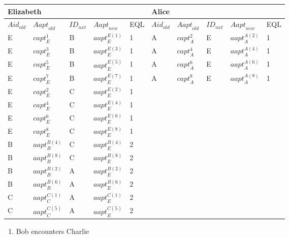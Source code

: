 \begin{tabular}{|p{0.4in}|p{0.5in}|p{0.3in}|p{0.5in}|p{0.3in}|p{0.4in}|p{0.4in}|p{0.3in}|p{0.5in}|p{0.3in}|} \hline 
\multicolumn{5}{|p{1in}|}{Elizabeth} & \multicolumn{5}{|p{1.8in}|}{Alice} \\ \hline 
${Aid}_{old}$ & ${Aapt}_{old}$ & ${ID}_{nxt}$ & ${Aapt}_{new}$ & EQL & ${Aid}_{old}$ & ${Aapt}_{old}$ & ${ID}_{nxt}$ & ${Aapt}_{new}$ & EQL \\ \hline 
E & ${capt}^1_E$ & B & ${aapt}^{E\left(1\right)}_E$ & 1 & A & ${capt}^2_A$ & E & ${aapt}^{A\left(2\right)}_A$ & 1 \\ \hline 
E & ${capt}^3_E$ & B & ${aapt}^{E\left(3\right)}_E$ & 1 & A & ${capt}^4_A$ & E & ${aapt}^{A\left(4\right)}_A$ & 1 \\ \hline 
E & ${capt}^5_E$ & B & ${aapt}^{E\left(5\right)}_E$ & 1 & A & ${capt}^6_A$ & E & ${aapt}^{A\left(6\right)}_A$ & 1 \\ \hline 
E & ${capt}^7_E$ & B & ${aapt}^{E\left(7\right)}_E$ & 1 & A & ${capt}^8_A$ & E & ${aapt}^{A\left(8\right)}_A$ & 1 \\ \hline 
E & ${capt}^2_E$ & C & ${aapt}^{E\left(2\right)}_E$ & 1 &  &  &  &  &  \\ \hline 
E & ${capt}^4_E$ & C & ${aapt}^{E\left(4\right)}_E$ & 1 &  &  &  &  &  \\ \hline 
E & ${capt}^6_E$ & C & ${aapt}^{E\left(6\right)}_E$ & 1 &  &  &  &  &  \\ \hline 
E & ${capt}^8_E$ & C & ${aapt}^{E\left(8\right)}_E$ & 1 &  &  &  &  &  \\ \hline 
B & ${aapt}^{B\left(4\right)}_B$ & C & ${aapt}^{B\left(4\right)}_E$ & 2 &  &  &  &  &  \\ \hline 
B & ${aapt}^{B\left(8\right)}_B$ & C & ${aapt}^{B\left(8\right)}_E$ & 2 &  &  &  &  &  \\ \hline 
B & ${aapt}^{B\left(2\right)}_B$ & A & ${aapt}^{B\left(2\right)}_E$ & 2 &  &  &  &  &  \\ \hline 
B & ${aapt}^{B\left(6\right)}_B$ & A & ${aapt}^{B\left(6\right)}_E$ & 2 &  &  &  &  &  \\ \hline 
C & ${aapt}^{C\left(1\right)}_C$ & A & ${aapt}^{C\left(1\right)}_E$ & 2 &  &  &  &  &  \\ \hline 
C & ${aapt}^{C\left(5\right)}_C$ & A & ${aapt}^{C\left(5\right)}_E$ & 2 &  &  &  &  &  \\ \hline 
\end{tabular}

\begin{enumerate}
\item  Bob encounters Charlie
\end{enumerate}

